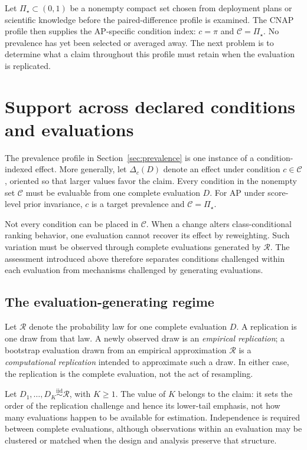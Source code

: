 \documentclass[11pt]{article}
\newcommand{\Regime}{\mathcal{R}}
\newcommand{\CSet}{\mathcal{C}}
\newcommand{\PSet}{\Pi_\star}
\newcommand{\iid}{\mathrel{\overset{\mathrm{iid}}{\sim}}}
\theoremstyle{remark}
\begin{document}
Let $\PSet\subset(0,1)$ be a nonempty compact set chosen from deployment plans or scientific knowledge before the paired-difference profile is examined. The CNAP profile then supplies the AP-specific condition index: $c=\pi$ and $\CSet=\PSet$. No prevalence has yet been selected or averaged away. The next problem is to determine what a claim throughout this profile must retain when the evaluation is replicated.

\section{Support across declared conditions and evaluations}
\label{sec:support}

The prevalence profile in Section~\ref{sec:prevalence} is one instance of a condition-indexed effect. More generally, let $\Delta_c(D)$ denote an effect under condition $c\in\CSet$, oriented so that larger values favor the claim. Every condition in the nonempty set $\CSet$ must be evaluable from one complete evaluation $D$. For AP under score-level prior invariance, $c$ is a target prevalence and $\CSet=\PSet$.

Not every condition can be placed in $\CSet$. When a change alters class-conditional ranking behavior, one evaluation cannot recover its effect by reweighting. Such variation must be observed through complete evaluations generated by $\Regime$. The assessment introduced above therefore separates conditions challenged within each evaluation from mechanisms challenged by generating evaluations.

\subsection{The evaluation-generating regime}

Let $\Regime$ denote the probability law for one complete evaluation $D$. A replication is one draw from that law. A newly observed draw is an \emph{empirical replication}; a bootstrap evaluation drawn from an empirical approximation $\widehat{\Regime}$ is a \emph{computational replication} intended to approximate such a draw. In either case, the replication is the complete evaluation, not the act of resampling.

Let $D_1,\ldots,D_K\iid\Regime$, with $K\geq1$. The value of $K$ belongs to the claim: it sets the order of the replication challenge and hence its lower-tail emphasis, not how many evaluations happen to be available for estimation. Independence is required between complete evaluations, although observations within an evaluation may be clustered or matched when the design and analysis preserve that structure.
\end{document}
